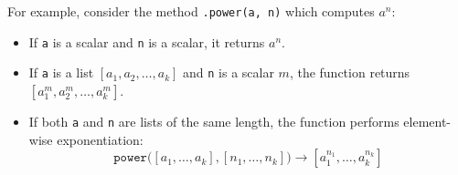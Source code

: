 For example, consider the method \texttt{.power(a, n)} which computes $a^n$:

\begin{itemize}
  \item If \texttt{a} is a scalar and \texttt{n} is a scalar, it returns $a^n$.
  \item If \texttt{a} is a list $[a_1, a_2, \dots, a_k]$ and \texttt{n} is a scalar $m$, the function returns $[a_1^m, a_2^m, \dots, a_k^m]$.
  \item If both \texttt{a} and \texttt{n} are lists of the same length, the function performs element-wise exponentiation:
  \[
    \texttt{power(}[a_1, \dots, a_k], [n_1, \dots, n_k]\texttt{)} \rightarrow [a_1^{n_1}, \dots, a_k^{n_k}]
  \]
\end{itemize}

